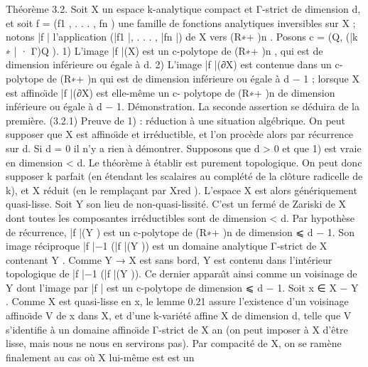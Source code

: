 \documentclass[
  10pt,
]{article}
\newenvironment{Shaded}{}{}
\newcommand{\NormalTok}[1]{#1}
\begin{document}
\begin{Shaded}
\begin{Highlighting}[]
\NormalTok{Théorème 3.2. Soit X un espace k{-}analytique compact et Γ{-}strict de dimension d,}
\NormalTok{et soit f = (f1 , . . . , fn ) une famille de fonctions analytiques inversibles sur X ;}
\NormalTok{notons |f | l’application (|f1 |, . . . , |fn |) de X vers (R∗+ )n . Posons c = (Q, (|k ∗ | · Γ)Q ).}
\NormalTok{1) L’image |f |(X) est un c{-}polytope de (R∗+ )n , qui est de dimension inférieure ou}
\NormalTok{   égale à d.}
\NormalTok{2) L’image |f |(∂X) est contenue dans un c{-}polytope de (R∗+ )n qui est de dimension}
\NormalTok{   inférieure ou égale à d − 1 ; lorsque X est aﬃnoı̈de |f |(∂X) est elle{-}même un c{-}}
\NormalTok{   polytope de (R∗+ )n de dimension inférieure ou égale à d − 1.}
\NormalTok{    Démonstration. La seconde assertion se déduira de la première.}
\NormalTok{(3.2.1) Preuve de 1) : réduction à une situation algébrique. On peut supposer}
\NormalTok{que X est aﬃnoı̈de et irréductible, et l’on procède alors par récurrence sur d. Si d = 0}
\NormalTok{il n’y a rien à démontrer. Supposons que d \textgreater{} 0 et que 1) est vraie en dimension \textless{} d.}
\NormalTok{     Le théorème à établir est purement topologique. On peut donc supposer k parfait}
\NormalTok{(en étendant les scalaires au complété de la clôture radicelle de k), et X réduit (en}
\NormalTok{le remplaçant par Xred ). L’espace X est alors génériquement quasi{-}lisse. Soit Y son}
\NormalTok{lieu de non{-}quasi{-}lissité. C’est un fermé de Zariski de X dont toutes les composantes}
\NormalTok{irréductibles sont de dimension \textless{} d. Par hypothèse de récurrence, |f |(Y ) est un}
\NormalTok{c{-}polytope de (R∗+ )n de dimension ⩽ d − 1. Son image réciproque |f |−1 (|f |(Y )) est}
\NormalTok{un domaine analytique Γ{-}strict de X contenant Y . Comme Y → X est sans bord, Y}
\NormalTok{est contenu dans l’intérieur topologique de |f |−1 (|f |(Y )). Ce dernier apparaı̂t ainsi}
\NormalTok{comme un voisinage de Y dont l’image par |f | est un c{-}polytope de dimension}
\NormalTok{⩽ d − 1.}
\NormalTok{     Soit x ∈ X − Y . Comme X est quasi{-}lisse en x, le lemme 0.21 assure l’existence}
\NormalTok{d’un voisinage aﬃnoı̈de V de x dans X, et d’une k{-}variété aﬃne X de dimension d,}
\NormalTok{telle que V s’identiﬁe à un domaine aﬃnoı̈de Γ{-}strict de X an (on peut imposer à X}
\NormalTok{d’être lisse, mais nous ne nous en servirons pas).}
\NormalTok{     Par compacité de X, on se ramène ﬁnalement au cas où X lui{-}même est est un}

\end{Highlighting}
\end{Shaded}
\end{document}
